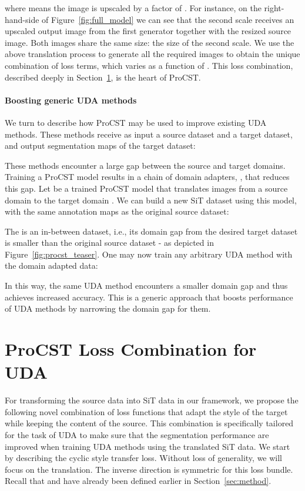 \documentclass[letterpaper]{article} \usepackage[]{aaai23}  \usepackage{times}  \usepackage{helvet}  \usepackage{courier}  \usepackage[hyphens]{url}  \usepackage{graphicx} \urlstyle{rm} \def\UrlFont{\rm}  \usepackage{natbib}  \usepackage{caption} \frenchspacing  \setlength{\pdfpagewidth}{8.5in} \setlength{\pdfpageheight}{11in} \usepackage{algorithm}
\begin{document}
where  means the image is upscaled by a factor of . 
For instance, on the right-hand-side of Figure~\ref{fig:full_model} we can see that the second scale receives an upscaled output image from the first generator together with the resized source image. Both images share the same size: the size of the second scale. We use the above translation process to generate all the required images to obtain the unique combination of loss terms, which varies as a function of . This loss combination, described deeply in Section~\ref{sec:losses}, is the heart of ProCST. 





\paragraph{Boosting generic UDA methods}
We turn to describe how ProCST may be used to improve existing UDA methods. 
These methods receive as input a source dataset and a target dataset, and output segmentation maps of the target dataset:

These methods encounter a large gap between the source and target domains.
Training a ProCST model results in a chain of domain adapters, , that reduces this gap. Let  be a trained ProCST model that translates images from a source domain  to the target domain . We can build a new SiT  dataset using this model, with the same annotation maps as the original source dataset:

The  is an in-between dataset, i.e., its domain gap from the desired target dataset is smaller than the original source dataset - as depicted in Figure~\ref{fig:procst_teaser}.
One may now train any arbitrary UDA method with the domain adapted  data:

In this way, the same UDA method encounters a smaller domain gap and thus achieves increased accuracy. This is a generic approach that boosts performance of UDA methods by narrowing the domain gap for them.


\section{ProCST Loss Combination for UDA}
\label{sec:losses}
For transforming the source data into SiT data in our framework, we propose the following novel combination of loss functions that adapt the style of the target while keeping the content of the source. This combination is specifically tailored for the task of UDA to make sure that the segmentation performance are improved when training UDA methods using the translated SiT data. We start by describing the cyclic style transfer loss.
Without loss of generality, we will focus on the  translation. The inverse direction is symmetric for this loss bundle. 
Recall that  and  have already been defined earlier in Section~\ref{sec:method}.  
\end{document}
